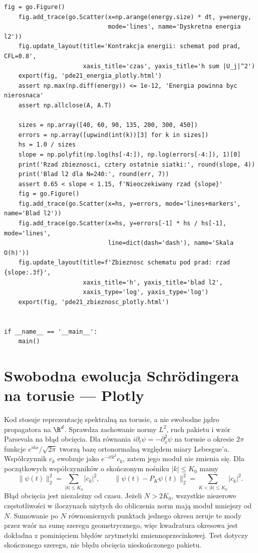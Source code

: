 \begin{lstlisting}[style=pythonpde,caption={Hiperboliczny układ, energia i zbieżność: Plotly},label={code:pde21-plotly}]
    fig = go.Figure()
    fig.add_trace(go.Scatter(x=np.arange(energy.size) * dt, y=energy,
                             mode='lines', name='Dyskretna energia l2'))
    fig.update_layout(title='Kontrakcja energii: schemat pod prad, CFL=0.8',
                      xaxis_title='czas', yaxis_title='h sum |U_j|^2')
    export(fig, 'pde21_energia_plotly.html')
    assert np.max(np.diff(energy)) <= 1e-12, 'Energia powinna byc nierosnaca'
    assert np.allclose(A, A.T)

    sizes = np.array([40, 60, 90, 135, 200, 300, 450])
    errors = np.array([upwind(int(k))[3] for k in sizes])
    hs = 1.0 / sizes
    slope = np.polyfit(np.log(hs[-4:]), np.log(errors[-4:]), 1)[0]
    print('Rzad zbieznosci, cztery ostatnie siatki:', round(slope, 4))
    print('Blad l2 dla N=240:', round(err, 7))
    assert 0.65 < slope < 1.15, f'Nieoczekiwany rzad {slope}'
    fig = go.Figure()
    fig.add_trace(go.Scatter(x=hs, y=errors, mode='lines+markers', name='Blad l2'))
    fig.add_trace(go.Scatter(x=hs, y=errors[-1] * hs / hs[-1], mode='lines',
                             line=dict(dash='dash'), name='Skala O(h)'))
    fig.update_layout(title=f'Zbieznosc schematu pod prad: rzad {slope:.3f}',
                      xaxis_title='h', yaxis_title='blad l2',
                      xaxis_type='log', yaxis_type='log')
    export(fig, 'pde21_zbieznosc_plotly.html')


if __name__ == '__main__':
    main()
\end{lstlisting}

\section{Swobodna ewolucja Schrödingera na torusie — Plotly}
\label{sec:pde22-code}
Kod stosuje reprezentację spektralną na torusie, a nie swobodne
jądro propagatora na $\R^d$. Sprawdza zachowanie normy
$L^2$, ruch pakietu i wzór Parsevala na błąd obcięcia.
Dla równania $i\partial_t\psi=-\partial_x^2\psi$
na torusie o okresie $2\pi$ funkcje
$e^{ikx}/\sqrt{2\pi}$ tworzą bazę ortonormalną
względem miary Lebesgue'a.
Współczynnik $c_k$ ewoluuje jako $e^{-itk^2}c_k$,
zatem jego moduł nie zmienia się.
Dla początkowych współczynników o skończonym nośniku
$|k|\le K_0$ mamy
\[
 \|\psi(t)\|_2^2=\sum_{|k|\le K_0}|c_k|^2,\qquad
 \|\psi(t)-P_K\psi(t)\|_2^2
 =\sum_{K<|k|\le K_0}|c_k|^2.
\]
Błąd obcięcia jest niezależny od czasu.
Jeżeli $N>2K_0$, wszystkie niezerowe częstotliwości
w iloczynach użytych do obliczenia norm mają moduł
mniejszy od $N$. Sumowanie po $N$ równomiernych
punktach jednego okresu zeruje te mody przez wzór
na sumę szeregu geometrycznego, więc kwadratura
okresowa jest dokładna z pominięciem błędów
arytmetyki zmiennoprzecinkowej.
Test dotyczy skończonego szeregu, nie błędu
obcięcia nieskończonego pakietu.

